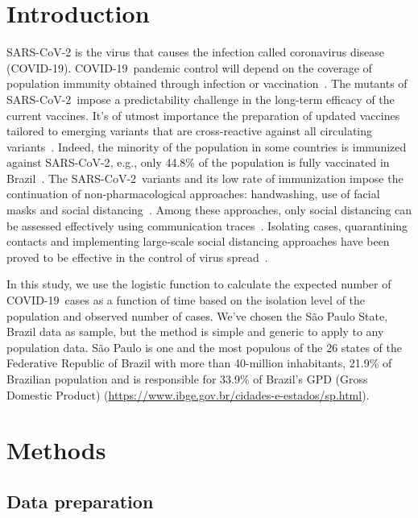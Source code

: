 \documentclass[times]{article}
\def\covid{\hbox{COVID-19}} %
\def\sarscov{{SARS-CoV-2}}
\begin{document}

\section{Introduction}
\label{intro}

SARS-CoV-2 is the virus that causes the infection 
called coronavirus disease (\covid). 
\covid\ pandemic control will depend 
on the coverage of population immunity obtained 
through infection or vaccination~\cite{WHOa}. 
The mutants of \sarscov\ impose a 
predictability challenge in the long-term efficacy 
of the current vaccines. 
 It's of utmost importance the preparation of updated 
 vaccines tailored to emerging variants that are cross-reactive 
 against all circulating variants~\cite{Harvey2021}. 
Indeed, the minority of the population in some countries 
is immunized against \sarscov, 
e.g., only 44.8\% of the population  
is fully vaccinated in Brazil~\cite{MH2021}.
The \sarscov\ variants and its low rate of immunization 
impose the continuation of non-pharmacological approaches: 
handwashing, use of facial masks and social distancing~\cite{WHOb}. 
Among these approaches, only social distancing 
can be assessed effectively using 
communication traces~\cite{Farrahi2014}. 
 Isolating cases, quarantining contacts and implementing
large-scale social distancing approaches have been proved to 
be effective in the control of virus spread~\cite{Aquino2020}.

In this study, we use the logistic function 
to calculate the expected number of \covid\ cases 
as a function of time
based 
on the isolation level of the population and 
observed number of cases. 
We've chosen the S\~{a}o Paulo State, Brazil data as sample, 
but the method is simple and generic 
to apply to any population data. 
S\~{a}o Paulo is one and the most populous of the 26 states 
of the Federative Republic of Brazil with 
more than 40-million inhabitants, 21.9\% 
of Brazilian population and is responsible for 33.9\% 
of Brazil's GPD (Gross Domestic Product) 
(\url{https://www.ibge.gov.br/cidades-e-estados/sp.html}).

\section{Methods}
\label{methods}

\subsection{Data preparation}
\end{document}
